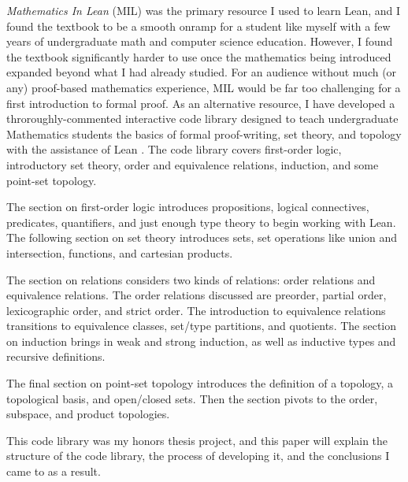 \textit{Mathematics In Lean} (MIL) was the primary resource I used 
to learn Lean, and I found the textbook to be a smooth
onramp for a student like myself with a few years of undergraduate
math and computer science education. However, I found the textbook
significantly harder to use once the mathematics being introduced 
expanded beyond what I had already studied. For an audience without
much (or any) proof-based mathematics experience, MIL would be 
far too challenging for a first introduction to formal proof.
As an alternative resource, I have developed a throroughly-commented
interactive code library designed to teach undergraduate Mathematics
students the basics of formal proof-writing, set theory, and topology 
with the assistance of Lean \cite{GrenierLIT}. The code library covers first-order logic,
introductory set theory, order and equivalence relations, induction, and
some point-set topology. 

The section on first-order logic introduces propositions, 
logical connectives, predicates, quantifiers, and just enough
type theory to begin working with Lean. The following section on
set theory introduces sets, set operations like union and intersection,
functions, and cartesian products.

The section on relations considers two kinds of relations:
order relations and equivalence relations. The order relations
discussed are preorder, partial order, lexicographic order, and 
strict order. The introduction to equivalence relations transitions 
to equivalence classes, set/type partitions, and quotients. The section
on induction brings in weak and strong induction, as well as inductive
types and recursive definitions.

The final section on point-set topology introduces the definition of a 
topology, a topological basis, and open/closed sets. Then the section
pivots to the order, subspace, and product topologies.

This code library was my honors thesis project, and this paper
will explain the structure of the code library, the process of
developing it, and the conclusions I came to as a result.